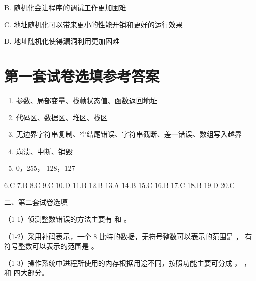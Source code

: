 \documentclass[UTF8]{ctexart}
\begin{document}
\noindent
B. 随机化会让程序的调试工作更加困难

\noindent
C. 地址随机化可以带来更小的性能开销和更好的运行效果

\noindent
D. 地址随机化使得漏洞利用更加困难

\section*{第一套试卷选填参考答案}

\begin{framed}

\begin{enumerate}
  \item 参数、局部变量、栈帧状态值、函数返回地址
  \item 代码区、数据区、堆区、栈区
  \item 无边界字符串复制、空结尾错误、字符串截断、差一错误、数组写入越界
  \item 崩溃、中断、销毁
  \item 0，255，-128，127
\end{enumerate}

\noindent
6.C \quad
7.B \quad
8.C \quad
9.C \quad
10.D \quad
11.B \quad
12.B \quad
13.A \quad
14.B \quad
15.C \quad
16.B \quad
17.C \quad
18.B \quad
19.D \quad
20.C

\end{framed}

\noindent
二、第二套试卷选填

\noindent
（1-1）侦测整数错误的方法主要有
\underline{\hspace{3cm}}
和
\underline{\hspace{3cm}}。

\vspace{0.8em}

\noindent
（1-2）采用补码表示，一个 8 比特的数据，无符号整数可以表示的范围是
\underline{\hspace{2cm}}，
有符号整数可以表示的范围是
\underline{\hspace{2cm}}。

\vspace{0.8em}

\noindent
（1-3）操作系统中进程所使用的内存根据用途不同，按照功能主要可分成
\underline{\hspace{2.5cm}}，
\underline{\hspace{2.5cm}}，
\underline{\hspace{2.5cm}}
和
\underline{\hspace{2.5cm}}
四大部分。
\end{document}
